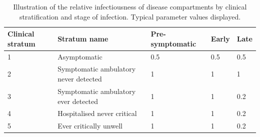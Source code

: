 \begin{table}[ht]
\renewcommand{\baselinestretch}{1}
    \begin{tabular}{| p{2cm} | p{6.6cm} | p{2.5cm} | l | l |}
    	\hline
        \textbf{Clinical stratum} & \textbf{Stratum name} & \textbf{Pre-symptomatic} &\textbf{Early} & \textbf{Late}\\
        \hline
        1 & Asymptomatic & \cellcolor[HTML]{DC6464}\textcolor[HTML]{FFFFFF}{0.5} & 
        \cellcolor[HTML]{DC6464}\textcolor[HTML]{FFFFFF}{0.5} & \cellcolor[HTML]{DC6464}\textcolor[HTML]{FFFFFF}{0.5} \\
        2 & Symptomatic ambulatory never detected & \cellcolor[HTML]{C90000}\textcolor[HTML]{FFFFFF}{1} & \cellcolor[HTML]{C90000}\textcolor[HTML]{FFFFFF}{1} & \cellcolor[HTML]{C90000}\textcolor[HTML]{FFFFFF}{1} \\
        3 & Symptomatic ambulatory ever detected & \cellcolor[HTML]{C90000}\textcolor[HTML]{FFFFFF}{1} & \cellcolor[HTML]{C90000}\textcolor[HTML]{FFFFFF}{1} & \cellcolor[HTML]{F0BEBE}\textcolor[HTML]{FFFFFF}{0.2} \\
        4 & Hospitalised never critical & \cellcolor[HTML]{C90000}\textcolor[HTML]{FFFFFF}{1} & \cellcolor[HTML]{C90000}\textcolor[HTML]{FFFFFF}{1} & \cellcolor[HTML]{F0BEBE}\textcolor[HTML]{FFFFFF}{0.2} \\
        5 & Ever critically unwell & 
        \cellcolor[HTML]{C90000}\textcolor[HTML]{FFFFFF}{1} & \cellcolor[HTML]{C90000}\textcolor[HTML]{FFFFFF}{1} & \cellcolor[HTML]{F0BEBE}\textcolor[HTML]{FFFFFF}{0.2} \\
        \hline
    \end{tabular}
    
    \caption{\small Illustration of the relative infectiousness of disease compartments by clinical stratification and stage of infection. Typical parameter values displayed.}
    \label{tab:clinical}
\end{table}

